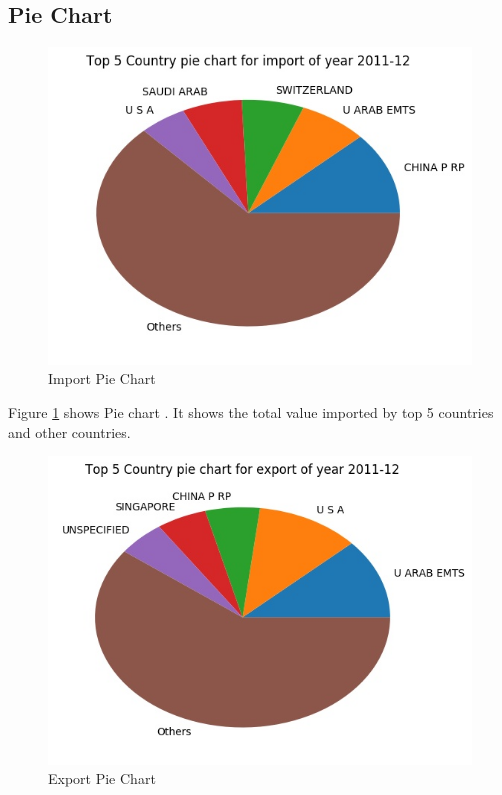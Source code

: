 \documentclass[a4paper,11pt]{article}
\begin{document}
\subsection{Pie  Chart}
\begin{figure}[H]
\centering
\includegraphics[scale=0.80,width=\textwidth]{image1.jpg}
  \caption{Import Pie Chart}
  \label{fig:pie1}
  
\end{figure}

Figure \ref{fig:pie1} shows Pie chart . It shows the total value imported by top 5 countries and other countries.


\begin{figure}[H]
\centering
\includegraphics[scale=0.80,width=\textwidth]{image2.jpg}
  \caption{Export Pie Chart}
  \label{fig:pie2}
  
\end{figure}
\end{document}

